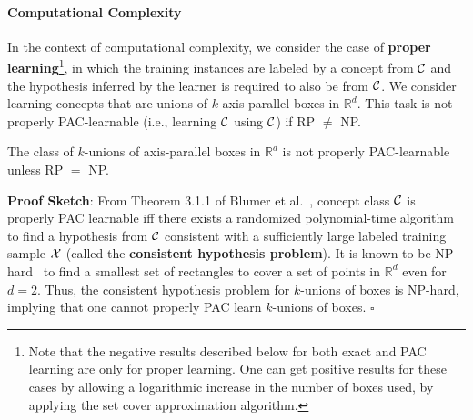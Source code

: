 \paragraph{Computational Complexity}
In the context  of computational complexity, we consider the case
of {\bf proper learning}\footnote{Note that the negative results described
below for both exact and PAC learning are only for proper learning.  One can
get positive results for these cases by allowing a logarithmic increase in the
number of boxes used, by applying the set cover approximation algorithm.},
in which the training instances are labeled by a
concept from $\cal C$ and the hypothesis inferred by the learner
is required to also be from $\cal C$.
%
%
We consider learning concepts  that are unions of
$k$ axis-parallel boxes in $\mathbb{R}^d$.  This
task is not properly PAC-learnable (i.e., learning $\cal C$ using $\cal C$)
if RP $\ne$ NP.
\begin{obs}
The class of $k$-unions of axis-parallel boxes in $\mathbb{R}^d$ is not
properly PAC-learnable unless RP $=$ NP.
\end{obs}
{\bf Proof Sketch}: From Theorem 3.1.1 of Blumer et al.~\cite{behw-lvd-89}, 
concept class $\cal C$ is properly PAC learnable  iff there exists a 
randomized polynomial-time algorithm to find a hypothesis from $\cal C$
consistent with a sufficiently large labeled training sample 
$\cal X$ (called the {\bf consistent hypothesis problem}).
It is known to be NP-hard~\cite{behw-lvd-89,m-sncscp-xx} to find a smallest
set of rectangles to cover a set of points in $\mathbb{R}^d$ even
for $d=2$.  Thus, the consistent hypothesis problem for
$k$-unions of boxes is NP-hard, implying that one 
cannot properly PAC learn $k$-unions of boxes.  \hfill $\square$

